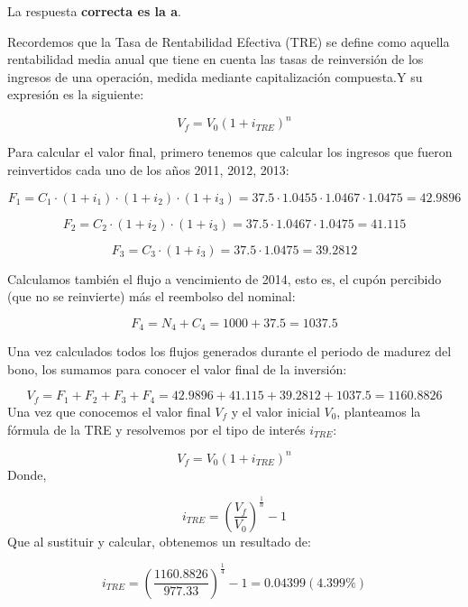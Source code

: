 \documentclass[
  letterpaper,
  DIV=11,
  numbers=noendperiod]{scrartcl}
\begin{document}
\begin{tcolorbox}[enhanced jigsaw, colframe=quarto-callout-note-color-frame, opacityback=0, colback=white, leftrule=.75mm, left=2mm, breakable, arc=.35mm, rightrule=.15mm, toprule=.15mm, bottomrule=.15mm]
\begin{minipage}[t]{5.5mm}
\textcolor{quarto-callout-note-color}{\faInfo}
\end{minipage}%
\begin{minipage}[t]{\textwidth - 5.5mm}

La respuesta \textbf{correcta es la a}.

Recordemos que la Tasa de Rentabilidad Efectiva (TRE) se define como
aquella rentabilidad media anual que tiene en cuenta las tasas de
reinversión de los ingresos de una operación, medida mediante
capitalización compuesta.Y su expresión es la siguiente:

\[V_f=V_0\left(1+i_{TRE}\right)^n\]

Para calcular el valor final, primero tenemos que calcular los ingresos
que fueron reinvertidos cada uno de los años 2011, 2012, 2013:

\[F_1=C_1\cdot\left(1+i_1\right)\cdot\left(1+i_2\right)\cdot\left(1+i_3\right)=37.5\cdot1.0455\cdot1.0467\cdot1.0475=42.9896\]

\[F_2=C_2\cdot\left(1+i_2\right)\cdot\left(1+i_3\right)=37.5\cdot1.0467\cdot1.0475=41.115\]

\[F_3=C_3\cdot\left(1+i_3\right)=37.5\cdot1.0475=39.2812\]

Calculamos también el flujo a vencimiento de 2014, esto es, el cupón
percibido (que no se reinvierte) más el reembolso del nominal:

\[F_4=N_4+C_4=1000+37.5=1037.5\]

Una vez calculados todos los flujos generados durante el periodo de
madurez del bono, los sumamos para conocer el valor final de la
inversión:

\[V_f=F_1+F_2+F_3+F_4=42.9896+41.115+39.2812+1037.5=1160.8826\] Una vez
que conocemos el valor final \(V_f\) y el valor inicial \(V_0\),
planteamos la fórmula de la TRE y resolvemos por el tipo de interés
\(i_{TRE}\):

\[V_f=V_0\left(1+i_{TRE}\right)^n\] Donde,

\[i_{TRE}=\left(\frac{V_f }{V_0 }\right)^{\frac{1 }{n }}-1\] Que al
sustituir y calcular, obtenemos un resultado de:

\[i_{TRE}=\left(\frac{ 1160.8826}{977.33 }\right)^{\frac{1 }{4 }}-1=0.04399(4.399\%)\]

\end{minipage}%
\end{tcolorbox}
\end{document}
